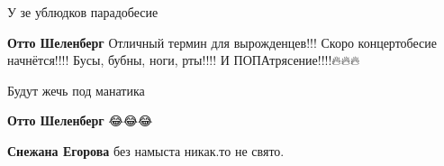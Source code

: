 \begin{itemize}
 
У зе ублюдков парадобесие

\begin{itemize}
 
\textbf{Отто Шеленберг} Отличный термин для вырожденцев!!!
Скоро концертобесие начнётся!!!!
Бусы, бубны, ноги, рты!!!!
И ПОПАтрясение!!!!🔥🔥🔥

 
Будут жечь под манатика

 
\textbf{Отто Шеленберг} 😂😂😂

 
\textbf{Снежана Егорова} без намыста никак.то не свято.
\end{itemize}



\end{itemize}

